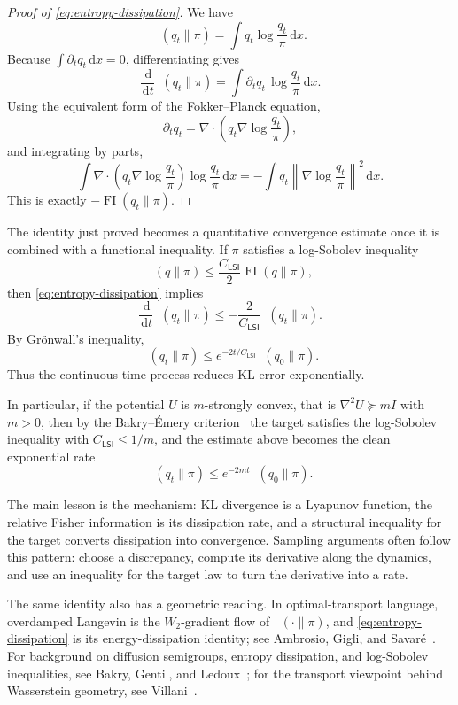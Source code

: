 \documentclass{amsart}
\numberwithin{equation}{section}
\theoremstyle{plain}
\theoremstyle{definition}
\theoremstyle{remark}
\DeclareMathOperator{\KL}{D_{\mathsf{KL}}}
\DeclareMathOperator{\FI}{FI}
\newcommand{\dd}{\,\mathrm{d}}
\newcommand{\Id}{I}
\newcommand{\norm}[1]{\left\lVert #1 \right\rVert}
\begin{document}
\begin{proof}[Proof of \eqref{eq:entropy-dissipation}]
We have
\[
    \KL(q_t\|\pi)=\int q_t\log\frac{q_t}{\pi}\dd x.
\]
Because $\int \partial_t q_t\dd x=0$, differentiating gives
\[
    \frac{\dd}{\dd t}\KL(q_t\|\pi)
    =
    \int \partial_tq_t\,\log\frac{q_t}{\pi}\dd x.
\]
Using the equivalent form of the Fokker--Planck equation,
\[
    \partial_tq_t
    =
    \nabla\cdot\!\left(q_t\nabla\log\frac{q_t}{\pi}\right),
\]
and integrating by parts,
\[
    \int
    \nabla\cdot\!\left(q_t\nabla\log\frac{q_t}{\pi}\right)
    \log\frac{q_t}{\pi}\dd x
    =
    -\int q_t\norm{\nabla\log\frac{q_t}{\pi}}^2\dd x.
\]
This is exactly $-\FI(q_t\|\pi)$.
\end{proof}

The identity just proved becomes a quantitative convergence estimate once it is
combined with a functional inequality.  If $\pi$ satisfies a log-Sobolev
inequality
\[
    \KL(q\|\pi)\leq \frac{C_{\mathsf{LSI}}}{2}\FI(q\|\pi),
\]
then \eqref{eq:entropy-dissipation} implies
\[
    \frac{\dd}{\dd t}\KL(q_t\|\pi)
    \leq
    -\frac{2}{C_{\mathsf{LSI}}}\KL(q_t\|\pi).
\]
By Gr\"onwall's inequality,
\[
    \KL(q_t\|\pi)
    \leq e^{-2t/C_{\mathsf{LSI}}}\KL(q_0\|\pi).
\]
Thus the continuous-time process reduces KL error exponentially.

In particular, if the potential $U$ is $m$-strongly convex, that is
$\nabla^2U\succeq m\Id$ with $m>0$, then by the Bakry--\'Emery
criterion~\cite{bakry2014analysis} the target satisfies the log-Sobolev
inequality with $C_{\mathsf{LSI}}\leq 1/m$, and the estimate above becomes the
clean exponential rate
\[
    \KL(q_t\|\pi)\leq e^{-2mt}\KL(q_0\|\pi).
\]

The main lesson is the mechanism: KL
divergence is a Lyapunov function, the relative Fisher information is its
dissipation rate, and a structural inequality for the target converts
dissipation into convergence.  Sampling arguments often follow this pattern:
choose a discrepancy, compute its derivative along the dynamics, and use an
inequality for the target law to turn the derivative into a rate.

The same identity also has a geometric reading.  In optimal-transport language,
overdamped Langevin is the $W_2$-gradient flow of $\KL(\cdot\|\pi)$, and
\eqref{eq:entropy-dissipation} is its energy-dissipation identity; see
Ambrosio, Gigli, and Savar\'e~\cite{ambrosio2008gradientflows}.  For background
on diffusion semigroups, entropy dissipation, and log-Sobolev inequalities, see
Bakry, Gentil, and Ledoux~\cite{bakry2014analysis}; for the transport viewpoint
behind Wasserstein geometry, see Villani~\cite{villani2009optimal}.
\end{document}
